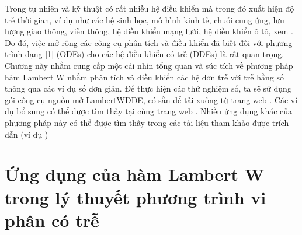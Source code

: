 Trong tự nhiên và kỹ thuật có rất nhiều hệ điều khiển mà trong đó xuất hiện độ trễ thời gian, ví dụ như các hệ sinh học, mô hình kinh tế, chuỗi cung ứng, lưu lượng giao thông, viễn thông, hệ điều khiển mạng lưới, hệ điều khiển ô tô, xem \cite{Sip11}. 
Do đó, việc mở rộng các công cụ phân tích và điều khiển đã biết đối với phương trình dạng \eqref{1} (ODEs) cho các hệ điều khiển có trễ (DDEs) là rất quan trọng. \
%
Chương này nhằm cung cấp một cái nhìn tổng quan và súc tích về phương pháp hàm Lambert W nhằm phân tích và điều khiển các hệ đơn trễ với trễ hằng số thông qua các ví dụ số đơn giản. 
Để thực hiện các thử nghiệm số, ta sẽ sử dụng gói công cụ nguồn mở LambertWDDE, có sẵn để tải xuống từ trang web \cite{Dua10}. 
Các ví dụ bổ sung có thể được tìm thấy tại cùng trang web \cite{Dua10}. Nhiều ứng dụng khác của phương pháp này có thể được tìm thấy trong các tài liệu tham khảo được trích dẫn (ví dụ \cite{Du12,Sip11,Yi07,Yi08,YiOc08,Yi10,Yi13})  


\section{Ứng dụng của hàm Lambert W trong lý thuyết phương trình vi phân có trễ}

